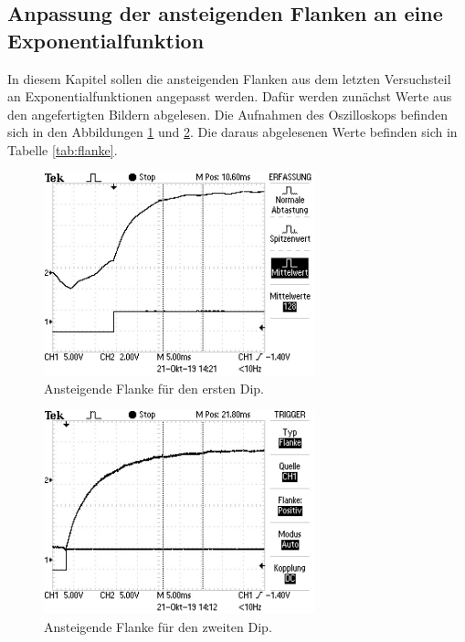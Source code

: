 \subsection{Anpassung der ansteigenden Flanken an eine Exponentialfunktion}
\label{subsec:flanken}

In diesem Kapitel sollen die ansteigenden Flanken aus dem letzten Versuchsteil an
Exponentialfunktionen angepasst werden. Dafür werden zunächst Werte aus den angefertigten
Bildern abgelesen. Die Aufnahmen des Oszilloskops befinden sich in den Abbildungen
\ref{fig:flanke1} und \ref{fig:flanke2}. Die daraus abgelesenen Werte befinden sich in
Tabelle \ref{tab:flanke}.

\begin{figure}
  \centering
  \includegraphics[width=0.7\textwidth]{data/Dip1.jpg}
  \caption{Ansteigende Flanke für den ersten Dip.}
  \label{fig:flanke1}
\end{figure}
\begin{figure}
  \centering
  \includegraphics[width=0.7\textwidth]{data/Dip2.jpg}
  \caption{Ansteigende Flanke für den zweiten Dip.}
  \label{fig:flanke2}
\end{figure}

